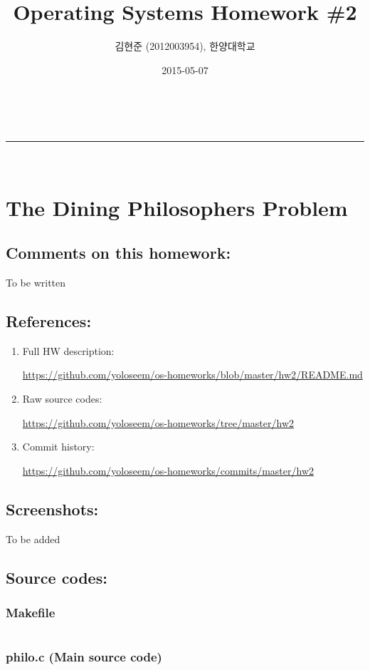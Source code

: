 \documentclass[a4paper,11pt]{article}
\makeatletter
\newcommand{\linia}{\rule{\linewidth}{0.5pt}}
\renewcommand{\maketitle}{
\begin{center}
\vspace{2ex}
{\huge \textsc{\@title}}
\vspace{1ex}
\\
\linia\\
\@author \hfill \@date
\vspace{4ex}
\end{center}
}
\makeatother
\begin{document}
\title{Operating Systems Homework \#2}

\author{김현준 (2012003954), 한양대학교}

\date{2015-05-07}

\maketitle

\section*{The Dining Philosophers Problem}

\subsection*{Comments on this homework:}
    To be written

\subsection*{References:}
\begin{enumerate}
\item
    Full HW description:
    
        \url{https://github.com/yoloseem/os-homeworks/blob/master/hw2/README.md}

\item
    Raw source codes:
    
        \url{https://github.com/yoloseem/os-homeworks/tree/master/hw2}

\item
    Commit history:
    
        \url{https://github.com/yoloseem/os-homeworks/commits/master/hw2}
\end{enumerate}

\subsection*{Screenshots:}
    To be added

\subsection*{Source codes:}

\subsubsection*{Makefile}
\inputminted[fontsize=\footnotesize,linenos]{basemake}{Makefile}

\subsubsection*{philo.c (Main source code)}
\inputminted[fontsize=\footnotesize,linenos]{c}{philo.c}
\end{document}
